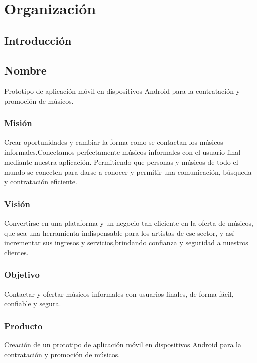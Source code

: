 \chapter{Organización}

\section{Introducción}

\section{Nombre}
Prototipo de aplicación móvil en dispositivos Android para la contratación y promoción de músicos.
\subsection{Misión}
Crear oportunidades y cambiar la forma como se contactan los músicos informales.Conectamos perfectamente músicos informales con el usuario final mediante nuestra aplicación. Permitiendo que personas y músicos de todo el mundo se conecten para darse a conocer y permitir una comunicación, búsqueda y contratación eficiente.
\subsection{Visión}
Convertirse en una plataforma y un negocio tan eficiente en la oferta de músicos, que sea una herramienta indispensable para los artistas de ese sector, y así incrementar sus ingresos y servicios,brindando confianza y seguridad a nuestros clientes.
\subsection{Objetivo}
Contactar y ofertar músicos informales con usuarios finales, de forma fácil, confiable y segura.
\newpage
\subsection{Producto}
Creación de un prototipo de aplicación móvil en dispositivos Android para la contratación y promoción de músicos.

